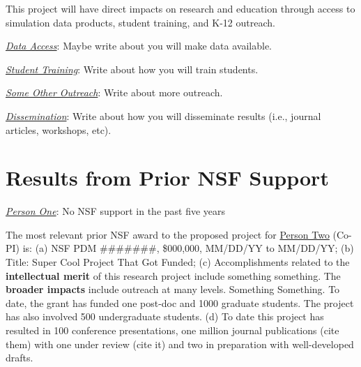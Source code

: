 \documentclass[nsfdescription]{nsfproposal}
\begin{document}
This project will have direct impacts on research and education through access to simulation data products, student training, and K-12 outreach.

\vspace{4pt}
\noindent \underline{\textit{Data Access}}: Maybe write about you will make data available.

\vspace{4pt}
\noindent \underline{\textit{Student Training}}: Write about how you will train students.

\vspace{4pt}
\noindent \underline{\textit{Some Other Outreach}}: Write about more outreach.

\vspace{4pt}
\noindent \underline{\textit{Dissemination}}: Write about how you will disseminate results (i.e., journal articles, workshops, etc).


\section{Results from Prior NSF Support}

\noindent \emph{\underline{Person One}}: No NSF support in the past five years \newline

\noindent The most relevant prior NSF award to the proposed project for \underline{Person Two} (Co-PI) is: (a) NSF PDM \#\#\#\#\#\#\#, \$000,000, MM/DD/YY to MM/DD/YY; (b) Title: Super Cool Project That Got Funded; (c) Accomplishments related to the {\bf intellectual merit} of this research project include something something. The {\bf broader impacts} include outreach at many levels. Something Something. To date, the grant has funded one post-doc and 1000 graduate students. The project has also involved 500 undergraduate students. (d) To date this project has resulted in 100 conference presentations, one million journal publications (cite them) with one under review (cite it) and two in preparation with well-developed drafts.

\newpage
\AtBeginShipout{%
\AtBeginShipoutDiscard
}


\end{document}
